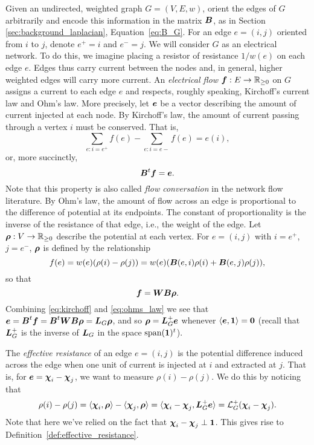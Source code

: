 Given an undirected, weighted graph $G=(V,E,w)$, orient the edges of $G$ arbitrarily and encode this information in the matrix $\vb*{B}$, as in Section \ref{sec:background_laplacian}, Equation~\eqref{eq:B_G}. For an edge $e=(i,j)$ oriented from $i$ to $j$, denote $e^+=i$ and $e^-=j$. 
We will consider $G$ as an electrical network. To do this, we imagine placing a resistor of resistance $1/w(e)$ on each edge $e$. Edges thus carry current between the nodes and, in general, higher weighted edges will carry more current.  
An \emph{electrical flow $\vb*{f}:E\to\mathbb{R}_{\geq 0}$} on $G$ assigns a current to each edge $e$ and respects, roughly speaking, Kirchoff's current law and Ohm's law. More precisely, let $\vb*{e}$ be a vector describing the amount of current injected at each node. By Kirchoff's law, the amount of current passing through a vertex $i$ must be conserved. That is, 
\[\sum_{e:i=e^+}f(e) - \sum_{e:i=e-}f(e) = e(i),\]
or, more succinctly, 
\begin{equation}
\label{eq:kirchoff}
\vb*{B}^t \vb*{f}=\vb*{e}. 
\end{equation}
Note that this property is also called \emph{flow conversation} in the network flow literature. 
By Ohm's law, the amount of flow across an edge is proportional to the difference of potential at its endpoints. The constant of proportionality is the inverse of the resistance of that edge, i.e., the weight of the edge. Let $\vb*{\rho}:V\to\mathbb{R}_{\geq 0}$ describe the potential at each vertex. For $e=(i,j)$ with $i=e^+$, $j=e^-$, $\vb*{\rho}$ is defined by the relationship 
\begin{equation*}
f(e) = w(e)(\rho(i)-\rho(j)) = w(e) (\vb*{B}(e,i)\rho(i) + \vb*{B}(e,j)\rho(j)),
\end{equation*}
so that
\begin{equation}
\label{eq:ohms_law}
\vb*{f}=\vb*{W}\vb*{B}\vb*{\rho}.
\end{equation}
Combining \eqref{eq:kirchoff} and \eqref{eq:ohms_law} we see that $\vb*{e}=\vb*{B}^t \vb*{f}=\vb*{B}^t \vb*{W}\vb*{B} \vb*{\rho} = \vb*{L}_G\vb*{\rho}$, and so $\vb*{\rho} = \vb*{L}_G^+\vb*{e}$ whenever $\langle \vb*{e},\vb{1}\rangle=\vb{0}$ (recall that $\vb*{L}_G^+$ is the inverse of $\vb*{L}_G$ in the space $\textnormal{span}(\vb{1})^t$).  

The \emph{effective resistance} of an edge $e=(i,j)$ is the potential difference induced across the edge when one unit of current is injected at $i$ and extracted at $j$. That is, for $\vb*{e}=\boldsymbol{\chi}_i-\boldsymbol{\chi}_j$, we want to measure $\rho(i)-\rho(j)$. We do this by noticing that 
\[\rho(i)-\rho(j) = \langle \boldsymbol{\chi}_i,\vb*{\rho}\rangle - \langle \boldsymbol{\chi}_j,\vb*{\rho}\rangle = \langle \boldsymbol{\chi}_i-\boldsymbol{\chi}_j,\vb*{L}_G^+\vb*{e}\rangle=\mathcal{L}_G^+(\boldsymbol{\chi}_i-\boldsymbol{\chi}_j).\]
Note that here we've relied on the fact that $\boldsymbol{\chi}_i-\boldsymbol{\chi}_j\perp \vb{1}$. This gives  rise to Definition~\ref{def:effective_resistance}. 




